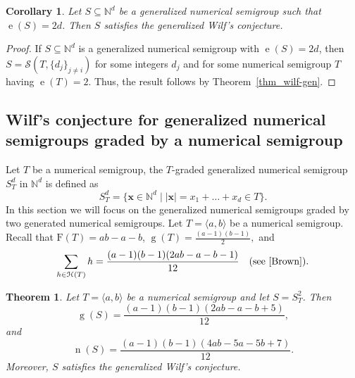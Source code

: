 \documentclass[12pt]{amsart}
\theoremstyle{plain}
\theoremstyle{theorem}
\newtheorem{theorem}[definition]{Theorem}
\newtheorem{corollary}[definition]{Corollary}
\newtheorem{remark}[definition]{Remark}
\theoremstyle{remark}
\begin{document}
\begin{corollary}\label{cor:wilfminembdim}
Let $S\subseteq \mathbb{N}^d$ be a generalized numerical semigroup such that $\operatorname{e}(S)=2d$. Then $S$ satisfies the generalized Wilf's conjecture.
\end{corollary}
\begin{proof}
If $S\subseteq \mathbb{N}^d$ is a generalized numerical semigroup with $\operatorname{e}(S)=2d$, then $S=\mathcal{S}(T,\{d_j\}_{j\neq i})$ for some integers $d_j$ and for some numerical semigroup $T$ having $\operatorname{e}(T)=2$. Thus, the result follows by Theorem~\ref{thm_wilf-gen}.
\end{proof}









\subsection{Wilf's conjecture for generalized numerical semigroups graded by a numerical semigroup}

Let $T$ be a numerical semigroup, the $T$-graded generalized numerical semigroup $S_T^d$ in $\mathbb{N}^d$ is defined as
\[ S_T^d = \{\mathbf{x} \in \mathbb{N}^d \mid |\mathbf{x}| = x_1+\ldots+x_d \in T\}.\]
In this section we will focus on the generalized numerical semigroups graded by two generated numerical semigroups. Let $T=\langle a,b\rangle$ be a numerical semigroup. Recall that $\mathrm{F}(T)=ab-a-b$, $
\operatorname{g}(T)=\frac{(a-1)(b-1)}{2},$
and
\[
\sum_{h\in \mathcal{H}(T)}h
=
\frac{(a-1)(b-1)(2ab-a-b-1)}{12} \quad (\text{see~\cite{Brown})}.
\]


\begin{theorem}\label{thm:graded-d2}
	Let $T=\langle a,b\rangle$ be a numerical semigroup and let $S=S_T^{2}$. Then
	\[
	\operatorname{g}(S)
	=
	\frac{(a-1)(b-1)(2ab-a-b+5)}{12},
	\]
	and
	\[
	\operatorname{n}(S)
	=
	\frac{(a-1)(b-1)(4ab-5a-5b+7)}{12}.
	\]
	Moreover, $S$ satisfies the generalized Wilf's conjecture.
\end{theorem}
\end{document}
